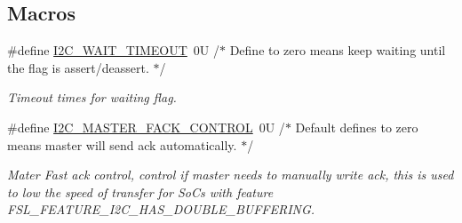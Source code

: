 \subsection*{Macros}
\begin{DoxyCompactItemize}
\item 
\mbox{\label{group__i2c__driver_ga2671b092f0b079174303710fa89f02bd}} 
\#define \mbox{\hyperlink{group__i2c__driver_ga2671b092f0b079174303710fa89f02bd}{I2\+C\+\_\+\+W\+A\+I\+T\+\_\+\+T\+I\+M\+E\+O\+UT}}~0\+U /$\ast$ Define to zero means keep waiting until the flag is assert/deassert. $\ast$/
\begin{DoxyCompactList}\small\item\em Timeout times for waiting flag. \end{DoxyCompactList}\item 
\mbox{\label{group__i2c__driver_gace639c1e5e7cdcecb1cca2e52c669029}} 
\#define \mbox{\hyperlink{group__i2c__driver_gace639c1e5e7cdcecb1cca2e52c669029}{I2\+C\+\_\+\+M\+A\+S\+T\+E\+R\+\_\+\+F\+A\+C\+K\+\_\+\+C\+O\+N\+T\+R\+OL}}~0\+U /$\ast$ Default defines to zero means master will send ack automatically. $\ast$/
\begin{DoxyCompactList}\small\item\em Mater Fast ack control, control if master needs to manually write ack, this is used to low the speed of transfer for So\+Cs with feature F\+S\+L\+\_\+\+F\+E\+A\+T\+U\+R\+E\+\_\+\+I2\+C\+\_\+\+H\+A\+S\+\_\+\+D\+O\+U\+B\+L\+E\+\_\+\+B\+U\+F\+F\+E\+R\+I\+NG. \end{DoxyCompactList}\end{DoxyCompactItemize}
